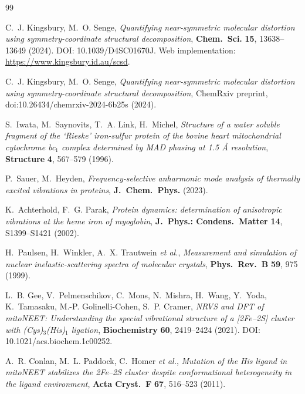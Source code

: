 \documentclass[11pt,a4paper,twoside]{article}
\theoremstyle{remark}
\begin{document}

\begin{thebibliography}{99}

C.~J. Kingsbury, M.~O. Senge,
\emph{Quantifying near-symmetric molecular distortion using
symmetry-coordinate structural decomposition},
\textbf{Chem.\ Sci.} \textbf{15}, 13638--13649 (2024).
DOI: 10.1039/D4SC01670J. Web implementation:
\url{https://www.kingsbury.id.au/scsd}.

C.~J. Kingsbury, M.~O. Senge,
\emph{Quantifying near-symmetric molecular distortion using
symmetry-coordinate structural decomposition},
ChemRxiv preprint, doi:10.26434/chemrxiv-2024-6b25s (2024).

S.~Iwata, M.~Saynovits, T.~A. Link, H.~Michel,
\emph{Structure of a water soluble fragment of the {`Rieske'} iron-sulfur
protein of the bovine heart mitochondrial cytochrome bc$_1$ complex
determined by {MAD} phasing at 1.5 \AA{} resolution},
\textbf{Structure} \textbf{4}, 567--579 (1996).

P.~Sauer, M.~Heyden,
\emph{Frequency-selective anharmonic mode analysis of thermally excited
vibrations in proteins},
\textbf{J.\ Chem.\ Phys.} (2023).

K.~Achterhold, F.~G. Parak,
\emph{Protein dynamics: determination of anisotropic vibrations at the
heme iron of myoglobin},
\textbf{J.\ Phys.: Condens.\ Matter} \textbf{14}, S1399--S1421 (2002).

H.~Paulsen, H.~Winkler, A.~X. Trautwein \emph{et al.},
\emph{Measurement and simulation of nuclear inelastic-scattering spectra
of molecular crystals},
\textbf{Phys.\ Rev.\ B} \textbf{59}, 975 (1999).

L.~B. Gee, V.~Pelmenschikov, C.~Mons, N.~Mishra, H.~Wang, Y.~Yoda,
K.~Tamasaku, M.-P. Golinelli-Cohen, S.~P. Cramer,
\emph{NRVS and DFT of mitoNEET: Understanding the special vibrational
structure of a [2Fe--2S] cluster with (Cys)$_3$(His)$_1$ ligation},
\textbf{Biochemistry} \textbf{60}, 2419--2424 (2021).
DOI: 10.1021/acs.biochem.1c00252.

A.~R. Conlan, M.~L. Paddock, C.~Homer \emph{et al.},
\emph{Mutation of the His ligand in mitoNEET stabilizes the 2Fe--2S
cluster despite conformational heterogeneity in the ligand environment},
\textbf{Acta Cryst.\ F} \textbf{67}, 516--523 (2011).


\end{thebibliography}
\end{document}
